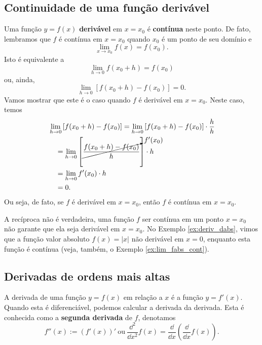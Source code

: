 \subsection{Continuidade de uma função derivável}

Uma função $y=f(x)$ {\bf derivável} em $x=x_0$ é {\bf contínua} neste ponto. De fato, lembramos que $f$ é contínua em $x=x_0$ quando $x_0$ é um ponto de seu domínio e
\begin{equation}
  \lim_{x\to x_0} f(x) = f(x_0).
\end{equation}
Isto é equivalente a
\begin{equation}
  \lim_{h\to 0} f(x_0+h) = f(x_0)
\end{equation}
ou, ainda,
\begin{equation}
  \lim_{h\to 0} \left[f(x_0+h)-f(x_0)\right] = 0.
\end{equation}
Vamos mostrar que este é o caso quando $f$ é derivável em $x=x_0$. Neste caso, temos
\begin{align}
  & \lim_{h\to 0} \left[f(x_0+h)-f(x_0)\right] = \lim_{h\to 0} \left[f(x_0+h)-f(x_0)\right]\cdot \frac{h}{h} \\
  & \text{}\quad = \lim_{h\to 0} \left[\cancelto{f'(x_0)}{\frac{f(x_0+h)-f(x_0)}{h}}\right]\cdot h \\
  & \text{}\quad = \lim_{h\to 0} f'(x_0)\cdot h \\
  & \text{}\quad = 0.
\end{align}
Ou seja, de fato, se $f$ é derivável em $x=x_0$, então $f$ é contínua em $x=x_0$.

\begin{obs}
  A recíproca não é verdadeira, uma função $f$ ser contínua em um ponto $x=x_0$ não garante que ela seja derivável em $x=x_0$. No Exemplo \ref{ex:deriv_dabs}, vimos que a função valor absoluto $f(x) = |x|$ não derivável em $x=0$, enquanto esta função é contínua (veja, também, o Exemplo \ref{ex:lim_fabs_cont}).
\end{obs}

\subsection{Derivadas de ordens mais altas}

A derivada de uma função $y = f(x)$ em relação a $x$ é a função $y = f'(x)$. Quando esta é diferenciável, podemos calcular a derivada da derivada. Esta é conhecida como a {\bf segunda derivada} de $f$, denotamos
\begin{equation}
  f''(x) := (f'(x))' ~ \text{ou} ~ \frac{\dd^2}{\dd x^2}f(x) = \frac{\dd}{\dd x}\left(\frac{\dd}{\dd x}f(x)\right).
\end{equation}

